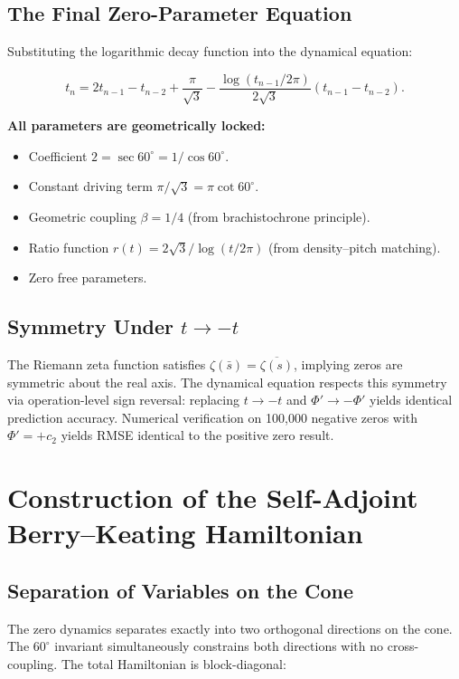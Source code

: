 \documentclass[12pt,a4paper]{article}
\begin{document}
\subsection{The Final Zero-Parameter Equation}

Substituting the logarithmic decay function into the dynamical equation:

\begin{equation}
\boxed{t_n = 2t_{n-1} - t_{n-2} + \frac{\pi}{\sqrt{3}} - \frac{\log(t_{n-1}/2\pi)}{2\sqrt{3}}(t_{n-1} - t_{n-2})}.
\end{equation}

\textbf{All parameters are geometrically locked:}
\begin{itemize}
\item Coefficient $2 = \sec 60^\circ = 1/\cos 60^\circ$.
\item Constant driving term $\pi/\sqrt{3} = \pi\cot 60^\circ$.
\item Geometric coupling $\beta = 1/4$ (from brachistochrone principle).
\item Ratio function $r(t) = 2\sqrt{3}/\log(t/2\pi)$ (from density--pitch matching).
\item Zero free parameters.
\end{itemize}

\subsection{Symmetry Under $t \to -t$}

The Riemann zeta function satisfies $\zeta(\bar{s}) = \overline{\zeta(s)}$, implying zeros are symmetric about the real axis. The dynamical equation respects this symmetry via operation-level sign reversal: replacing $t \to -t$ and $\Phi' \to -\Phi'$ yields identical prediction accuracy. Numerical verification on 100,000 negative zeros with $\Phi' = +c_2$ yields RMSE identical to the positive zero result.

\section{Construction of the Self-Adjoint Berry--Keating Hamiltonian}

\subsection{Separation of Variables on the Cone}

The zero dynamics separates exactly into two orthogonal directions on the cone. The $60^\circ$ invariant simultaneously constrains both directions with no cross-coupling. The total Hamiltonian is block-diagonal:
\end{document}
